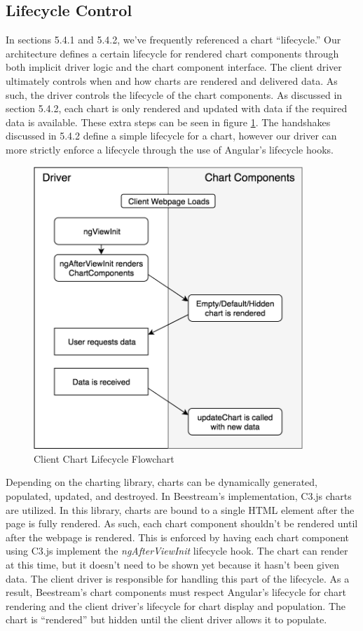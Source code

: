 \subsection{Lifecycle Control}

In sections 5.4.1 and 5.4.2, we’ve frequently referenced a chart “lifecycle.”  Our architecture defines a certain lifecycle for rendered chart components through both implicit driver logic and the chart component interface.  The client driver ultimately controls when and how charts are rendered and delivered data.  As such, the driver controls the lifecycle of the chart components.  As discussed in section 5.4.2, each chart is only rendered and updated with data if the required data is available.  These extra steps can be seen in figure \ref{fig:client-lifecycle-flow}.  The handshakes discussed in 5.4.2 define a simple lifecycle for a chart, however our driver can more strictly enforce a lifecycle through the use of Angular’s lifecycle hooks. \par
\begin{figure}
    \centering
    \includegraphics[width=4in]{images/ClientLifecycle.png}
    \caption{Client Chart Lifecycle Flowchart}
    \label{fig:client-lifecycle-flow}
\end{figure}
Depending on the charting library, charts can be dynamically generated, populated, updated, and destroyed.  In Beestream’s implementation, C3.js charts are utilized.  In this library, charts are bound to a single HTML element after the page is fully rendered.  As such, each chart component shouldn’t be rendered until after the webpage is rendered.  This is enforced by having each chart component using C3.js implement the \textit{ngAfterViewInit} lifecycle hook.  The chart can render at this time, but it doesn’t need to be shown yet because it hasn’t been given data.  The client driver is responsible for handling this part of the lifecycle.  As a result, Beestream’s chart components must respect Angular’s lifecycle for chart rendering and the client driver’s lifecycle for chart display and population.  The chart is “rendered” but hidden until the client driver allows it to populate. \par
